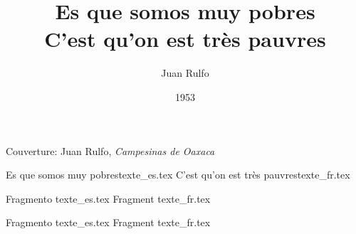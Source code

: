 \documentclass[a5paper]{book}
\begin{document}
\title{Es que somos muy pobres\\
	\normalsize C'est qu'on est très pauvres%
}

\date{1953}
\author{Juan Rulfo}

\begin{titlepage}
	
\end{titlepage}

\thispagestyle{empty}
\vspace*{\fill}
\begin{center}
	\begin{minipage}{11em}
		Couverture: Juan Rulfo, \textit{Campesinas de Oaxaca}
	\end{minipage}
\end{center}
\addtocounter{page}{-1}
\newpage

\myemptypage

%
{Es que somos muy pobres}{texte_es.tex}%
{C'est qu'on est très pauvres}{texte_fr.tex}

%
{Fragmento }{texte_es.tex}%
{Fragment }{texte_fr.tex}

%
{Fragmento }{texte_es.tex}%
{Fragment }{texte_fr.tex}
\end{document}
